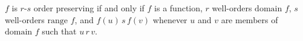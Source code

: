 $f$ is $r$-$s$ order preserving if and only if $f$ is a function, $r$ well-orders $\text{domain } f$, $s$ well-orders $\text{range } f$, and $f(u) \, s \, f(v)$ whenever $u$ and $v$ are members of $\text{domain } f$ such that $u \, r \, v$.
